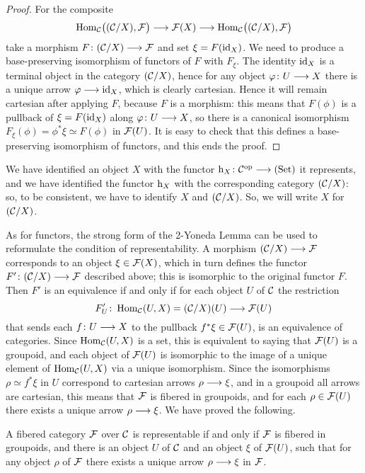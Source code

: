 \begin{3   FIBERED CATEGORIES}
\begin{3.6 Objects as fibcats and the 2-Yoneda}
\begin{proof}
For the composite
   \[
   \hom_{\cC}\bigl((\cC/X), \cF\bigr)
   \arr \cF(X)
   \arr
   \hom_{\cC}\bigl((\cC/X), \cF\bigr)
   \]
take a morphism $F \colon (\cC/X) \arr \cF$ and set $\xi = F(\mathrm{id}_X)$. We need to produce a base-preserving isomorphism of functors of $F$ with $F_\xi$. The identity $\mathrm{id}_X$ is a terminal object in the category $(\mathcal{C}/X)$, hence for any object $\phi \colon U \arr X$ there is a unique arrow $\phi \arr \id_X$, which is clearly cartesian. Hence it will remain cartesian after applying $F$, because $F$ is a morphism: this means that $F(\phi)$ is a pullback of $\xi = F(\mathrm{id}_X)$ along $\phi \colon U \arr X$, so there is a canonical isomorphism $F_\xi(\phi) = \phi^*\xi \simeq F(\phi)$ in $\mathcal{F}(U)$. It is easy to check that this defines a base-preserving isomorphism of functors, and this ends the proof.
\end{proof}



We have identified an object $X$ with the functor $\h_X \colon \cC\op \arr \catset$ it represents, and we have identified the functor $\mathrm{h}_X$ with the corresponding category $(\mathcal{C}/X)$: so, to be consistent, we have to identify $X$ and $(\mathcal{C}/X)$. So, we will write $X$ for $(\mathcal{C}/X)$.

As for functors, the strong form of the 2-Yoneda Lemma can be used to reformulate the condition of representability. A morphism $(\cC/X) \arr \cF$ corresponds to an object $\xi\in \mathcal{F}(X)$, which in turn defines the functor $F'\colon (\cC/X) \arr \cF$ described above; this is isomorphic to the original functor $F$. Then $F'$ is an equivalence if and only if for each object $U$ of $\mathcal{C}$ the restriction
   \[
   F'_U \colon \hom_{\cC}(U, X) = (\cC/X)(U)
   \arr \cF(U)
   \]
that sends each $f \colon U \arr X$ to the pullback $f^* \xi \in \mathcal{F}(U)$, is an equivalence of categories. Since $\operatorname{Hom}_{\mathcal{C}}(U, X)$ is a set, this is equivalent to saying that $\mathcal{F}(U)$ is a groupoid, and each object of $\mathcal{F}(U)$ is isomorphic to the image of a unique element of $\operatorname{Hom}_{\mathcal{C}}(U,X)$ via a unique isomorphism. Since the isomorphisms $\rho \simeq f^* \xi$ in $U$ correspond to cartesian arrows $\rho \arr \xi$, and in a groupoid all arrows are cartesian, this means that $\mathcal{F}$ is fibered in groupoids, and for each $\rho\in \mathcal{F}(U)$ there exists a unique arrow $\rho \arr \xi$. We have proved the following.

\begin{proposition}
A fibered category $\mathcal{F}$ over $\mathcal{C}$ is representable if and only if $\mathcal{F}$ is fibered in groupoids, and there is an object $U$ of $\mathcal{C}$ and an object $\xi$ of $\mathcal{F}(U)$, such that for any object $\rho$ of $\mathcal{F}$ there exists a unique arrow $\rho \arr \xi$ in $\mathcal{F}$.
\end{proposition}



\end{3.6 Objects as fibcats and the 2-Yoneda}
\end{3   FIBERED CATEGORIES}
